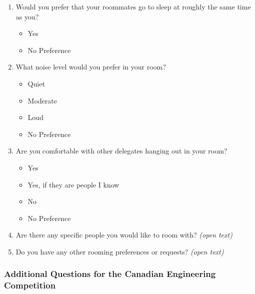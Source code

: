 \begin{enumerate}
\begin{enumerate}
   \item
    Would you prefer that your roommates go to sleep at roughly the same time as you?
    \begin{itemize}
     \item Yes
     \item No Preference
    \end{itemize}

   \item
    What noise level would you prefer in your room?
    \begin{itemize}
     \item Quiet
     \item Moderate
     \item Loud
     \item No Preference
    \end{itemize}

   \item
    Are you comfortable with other delegates hanging out in your room?
    \begin{itemize}
     \item Yes
     \item Yes, if they are people I know
     \item No
     \item No Preference
    \end{itemize}

   \item
    Are there any specific people you would like to room with? \emph{(open text)}

   \item
    Do you have any other rooming preferences or requests? \emph{(open text)}

  \end{enumerate}
\end{enumerate}

\subsubsection{Additional Questions for the Canadian Engineering Competition}
\label{cec-rooming-questions}

